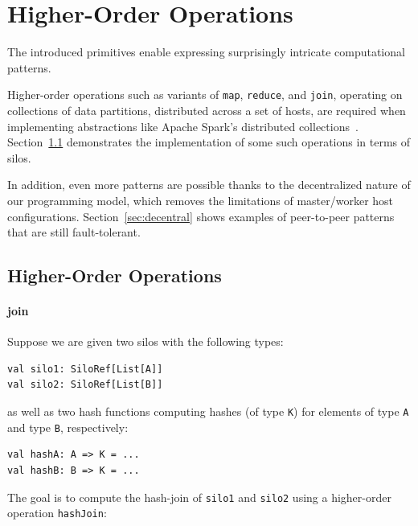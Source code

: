 \documentclass{jfp1}
\begin{document}
\section{Higher-Order Operations}
\label{sec:higher-order-operations}

The introduced primitives enable expressing surprisingly intricate computational
patterns.

Higher-order operations such as variants of \verb|map|, \verb|reduce|, and
\verb|join|, operating on collections of data partitions, distributed across a
set of hosts, are required when implementing abstractions like Apache Spark's
distributed collections~\cite{Spark}. Section~\ref{sec:dist-coll} demonstrates
the implementation of some such operations in terms of silos.

In addition, even more patterns are possible thanks to the decentralized nature
of our programming model, which removes the limitations of master/worker host
configurations. Section~\ref{sec:decentral} shows examples of peer-to-peer
patterns that are still fault-tolerant.


\subsection{Higher-Order Operations}
\label{sec:dist-coll}

%

\paragraph{join}

Suppose we are given two silos with the following types:

\begin{lstlisting}
val silo1: SiloRef[List[A]]
val silo2: SiloRef[List[B]]
\end{lstlisting}
\noindent
as well as two hash functions computing hashes (of type \verb|K|) for elements
of type \verb|A| and type \verb|B|, respectively:

\begin{lstlisting}
val hashA: A => K = ...
val hashB: B => K = ...
\end{lstlisting}
\noindent
The goal is to compute the hash-join of \verb|silo1| and \verb|silo2| using a
higher-order operation \verb|hashJoin|:
\end{document}
